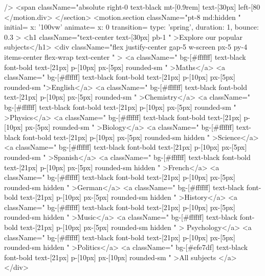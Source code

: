 {            />
            <span className="absolute right-0 text-black mt-[0.9rem] text-[30px] left-[80%
          </motion.div>
        </section>
        <motion.section className="pt-8 md:hidden  " initial={{ x: '100vw' }} animate={{ x: 0 }} transition={{ type: 'spring', duration: 1, bounce: 0.3 }} >
          <h1 className="text-center text-[30px] pb-1 " >Explore our popular subjects</h1>
          <div className="flex justify-center gap-5 w-screen px-5 py-4  items-center flex-wrap  text-center " >
            <a className=" bg-[#ffffff] text-black font-bold text-[21px] p-[10px] px-[5px] rounded-sm  " >Maths</a>
            <a className=" bg-[#ffffff] text-black font-bold text-[21px] p-[10px]  px-[5px] rounded-sm  ">English</a>
            <a className=" bg-[#ffffff] text-black font-bold text-[21px] p-[10px]  px-[5px] rounded-sm  " >Chemistry</a>
            <a className=" bg-[#ffffff] text-black font-bold text-[21px] p-[10px]  px-[5px] rounded-sm  " >Physics</a>
            <a className=" bg-[#ffffff] text-black font-bold text-[21px] p-[10px]  px-[5px] rounded-sm  " >Biology</a>
            <a className=" bg-[#ffffff] text-black font-bold text-[21px] p-[10px]  px-[5px] rounded-sm hidden " >Science</a>
            <a className=" bg-[#ffffff] text-black font-bold text-[21px] p-[10px] px-[5px]  rounded-sm  " >Spanish</a>
            <a className=" bg-[#ffffff] text-black font-bold text-[21px] p-[10px]  px-[5px] rounded-sm hidden " >French</a>
            <a className=" bg-[#ffffff] text-black font-bold text-[21px] p-[10px]  px-[5px] rounded-sm hidden " >German</a>
            <a className=" bg-[#ffffff] text-black font-bold text-[21px] p-[10px]  px-[5px] rounded-sm hidden " >History</a>
            <a className=" bg-[#ffffff] text-black font-bold text-[21px] p-[10px]  px-[5px] rounded-sm hidden " >Music</a>
            <a className=" bg-[#ffffff] text-black font-bold text-[21px] p-[10px]  px-[5px] rounded-sm hidden " > Psychology</a>
            <a className=" bg-[#ffffff] text-black font-bold text-[21px] p-[10px]  px-[5px] rounded-sm hidden " >Politics</a>
            <a className=" bg-[#efe7df] text-black font-bold text-[21px] p-[10px]  px-[10px] rounded-sm  " >All subjects </a>
          </div>

}
